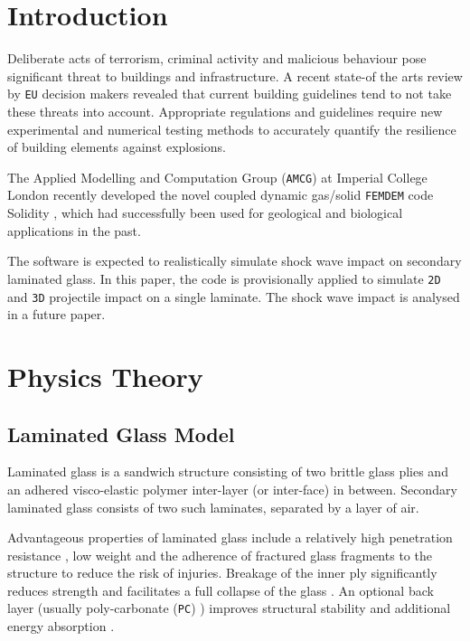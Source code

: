 \documentclass[12pt,twoside]{article}
\theoremstyle{break}
\begin{document}
\section{Introduction}

Deliberate acts of terrorism, criminal activity and malicious behaviour pose significant threat to buildings and infrastructure. A recent state-of the arts review by \texttt{EU} decision makers \cite{Sto15} revealed that current building guidelines tend to not take these threats into account. Appropriate regulations and guidelines require new experimental and numerical testing methods to accurately quantify the resilience of building elements against explosions.

\bigbreak
The Applied Modelling and Computation Group (\texttt{AMCG}) at Imperial College London \cite{AMC03} recently developed the novel coupled dynamic gas/solid \texttt{FEMDEM} code Solidity \cite{Lat15}, which had successfully been used for geological and biological applications in the past.

\bigbreak
The software is expected to realistically simulate shock wave impact on secondary laminated glass. In this paper, the code is provisionally applied to simulate \texttt{2D} and \texttt{3D} projectile impact on a single laminate. The shock wave impact is analysed in a future paper.

\section{Physics Theory}
\label{sec:PhysicsTheory}

\subsection{Laminated Glass Model}


Laminated glass is a sandwich structure consisting of two brittle glass plies and an adhered visco-elastic polymer inter-layer (or inter-face) in between. Secondary laminated glass consists of two such laminates, separated by a layer of air.

\bigbreak
Advantageous properties of laminated glass include a relatively high penetration resistance \cite{Xu14}, low weight \cite{Wu14} and the adherence of fractured glass fragments to the structure to reduce the risk of injuries\cite{Xu14, Che17, Flo98, Ji98}. Breakage of the inner ply significantly reduces strength and facilitates a full collapse of the glass \cite{Flo98}. An optional back layer (usually poly-carbonate (\texttt{PC}) \cite{Bra10, Mon04}) improves structural stability and additional energy absorption \cite{Bio10, Bra10}.
\end{document}

